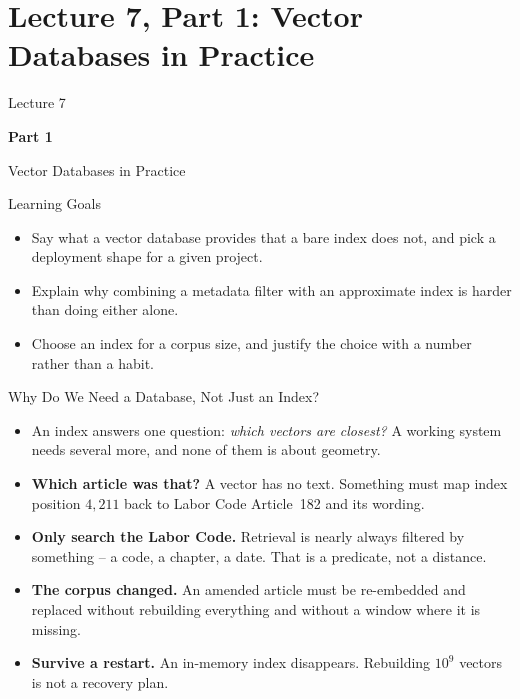 \section{Lecture 7, Part 1: Vector Databases in Practice}

\begin{frame}
\vfill
\centering
{\color{RLBlue}\large Lecture 7}

\vspace{0.3em}
{\color{RLBlue}\Large\bfseries Part 1}

\vspace{0.6em}
{\Large Vector Databases in Practice}
\vfill
\end{frame}

\begin{frame}{Learning Goals}
\begin{itemize}
  \item Say what a vector database provides that a bare index does not, and pick a deployment shape for a given project.
  \pause
  \item Explain why combining a metadata filter with an approximate index is harder than doing either alone.
  \pause
  \item Choose an index for a corpus size, and justify the choice with a number rather than a habit.
\end{itemize}
\end{frame}

\begin{frame}{Why Do We Need a Database, Not Just an Index?}
\begin{itemize}
  \item An index answers one question: \emph{which vectors are closest?} A working system needs several more, and none of them is about geometry.
  \pause
  \item \textbf{Which article was that?} A vector has no text. Something must map index position $4{,}211$ back to Labor Code Article~182 and its wording.
  \pause
  \item \textbf{Only search the Labor Code.} Retrieval is nearly always filtered by something -- a code, a chapter, a date. That is a predicate, not a distance.
  \pause
  \item \textbf{The corpus changed.} An amended article must be re-embedded and replaced without rebuilding everything and without a window where it is missing.
  \pause
  \item \textbf{Survive a restart.} An in-memory index disappears. Rebuilding $10^9$ vectors is not a recovery plan.
\end{itemize}
\end{frame}

